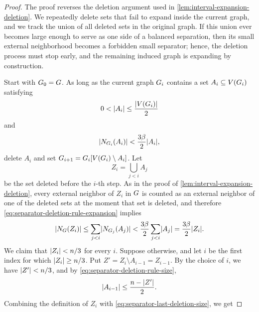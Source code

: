 \begin{proof}
	The proof reverses the deletion argument used in \cref{lem:interval-expansion-deletion}. We repeatedly delete sets that fail to expand inside the current graph, and we track the union of all deleted sets in the original graph. If this union ever becomes large enough to serve as one side of a balanced separation, then its small external neighborhood becomes a forbidden small separator; hence, the deletion process must stop early, and the remaining induced graph is expanding by construction.

	Start with \(G_0=G\). As long as the current graph \(G_i\) contains a set \(A_i\subseteq V(G_i)\) satisfying
	\begin{equation}
		\label{eq:separator-deletion-rule-size}
		0<\lvert A_i\rvert\leq \frac{\lvert V(G_i)\rvert}{2}
	\end{equation}
	and
	\begin{equation}
		\label{eq:separator-deletion-rule-expansion}
		\lvert N_{G_i}(A_i)\rvert<\frac{3\beta}{2}\lvert A_i\rvert,
	\end{equation}
	delete \(A_i\) and set \(G_{i+1}=G_i[V(G_i)\setminus A_i]\). Let
	\begin{equation}
		\label{eq:separator-deleted-union}
		Z_i=\bigcup_{j<i}A_j
	\end{equation}
	be the set deleted before the \(i\)-th step. As in the proof of \cref{lem:interval-expansion-deletion}, every external neighbor of \(Z_i\) in \(G\) is counted as an external neighbor of one of the deleted sets at the moment that set is deleted, and therefore \cref{eq:separator-deletion-rule-expansion} implies
	\begin{equation}
		\label{eq:separator-deleted-union-neighborhood}
		\lvert N_{G}(Z_i)\rvert\leq \sum_{j<i}\lvert N_{G_j}(A_j)\rvert<\frac{3\beta}{2}\sum_{j<i}\lvert A_j\rvert=\frac{3\beta}{2}\lvert Z_i\rvert.
	\end{equation}
	We claim that \(\lvert Z_i\rvert<n/3\) for every \(i\). Suppose otherwise, and let \(i\) be the first index for which \(\lvert Z_i\rvert\geq n/3\). Put \(Z'=Z_i\setminus A_{i-1}=Z_{i-1}\). By the choice of \(i\), we have \(\lvert Z'\rvert<n/3\), and by \cref{eq:separator-deletion-rule-size},
	\begin{equation}
		\label{eq:separator-last-deletion-size}
		\lvert A_{i-1}\rvert\leq \frac{n-\lvert Z'\rvert}{2}.
	\end{equation}
	Combining the definition of \(Z_i\) with \cref{eq:separator-last-deletion-size}, we get

\end{proof}
